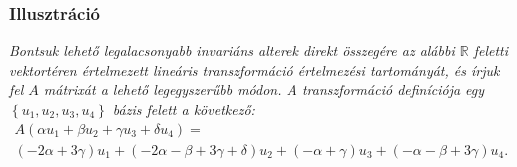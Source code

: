 \documentclass[a4paper, showtrims]{memoir}
\theoremstyle{plain}
\theoremstyle{remark}
\theoremstyle{definition}
\begin{document}
\subsubsection{Illusztráció}
\textit{%
	Bontsuk lehető legalacsonyabb invariáns alterek direkt összegére az alábbi $\mathbb{R}$
	feletti vektortéren értelmezett lineáris transzformáció értelmezési tartományát,
	és írjuk fel $A$ mátrixát a lehető legegyszerűbb módon.
	A transzformáció definíciója egy
	$\left\{
		u_1,u_2,u_3,u_4
		\right\}
	$
	bázis felett a következő:
    \begin{multline*}
		A
		\left(
		\alpha u_1
		+
		\beta u_2
		+
		\gamma u_3
		+
		\delta u_4
		\right)
		=\\
		\left( -2\alpha + 3\gamma \right)u_1
		+
		\left( -2\alpha-\beta+3\gamma+\delta \right)u_2
		+
		\left( -\alpha+\gamma \right)u_3
		+
		\left( -\alpha-\beta+3\gamma \right)u_4.
    \end{multline*}
}
\end{document}

